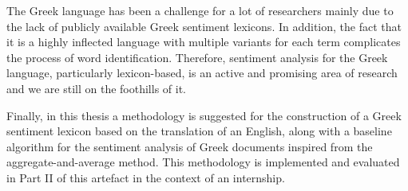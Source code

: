 The Greek language has been a challenge for a lot of researchers
mainly due to the lack of publicly available Greek sentiment lexicons.
In addition, the fact that it is a highly inflected language
with multiple variants for each term complicates the process
of word identification.
Therefore, sentiment analysis for the Greek language, particularly
lexicon-based, is an active and promising area of research
and we are still on the foothills of it.

Finally, in this thesis a methodology is suggested for the construction
of a Greek sentiment lexicon based on the translation of an English,
along with a baseline algorithm for the sentiment analysis of Greek documents
inspired from the aggregate-and-average method.
This methodology is implemented and evaluated in Part II of this artefact
in the context of an internship.
